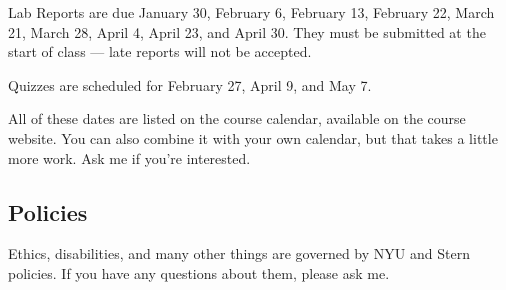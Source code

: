 \documentclass[11pt]{article}
\begin{document}
Lab Reports are due January 30, February 6, February 13, February 22,
March 21, March 28, April 4, April 23, and April 30.
%
They must be submitted at the start of class --- late reports will not be accepted.

Quizzes are scheduled for February 27, April 9, and May 7.

All of these dates are listed on the course calendar,
available on the course website.
You can also combine it with your own calendar, but that takes a little more work.
Ask me if you're interested.



\subsection*{Policies}

Ethics, disabilities, and many other things are governed by NYU
and Stern policies.
If you have any questions about them, please ask me.
\end{document}
